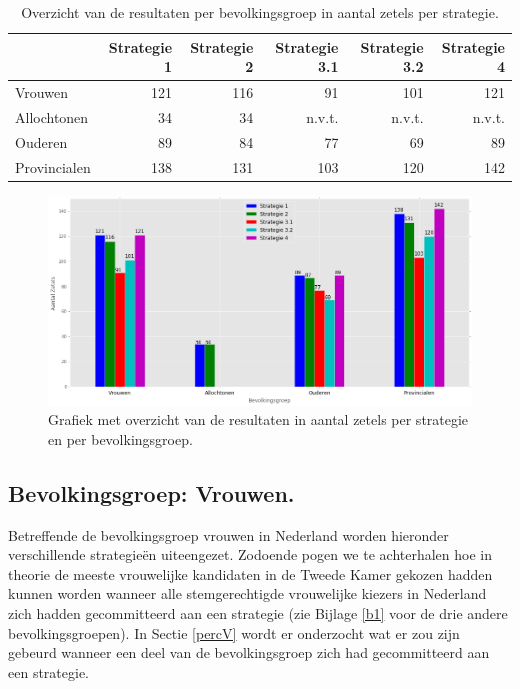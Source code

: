 \begin{table}[h]
\captionsetup{skip=-2pt}
\begin{center}
\begin{footnotesize}
\begin{tabular}{lrrrrr}
\toprule
{} &  Strategie 1 &  Strategie 2 &  Strategie 3.1 &  Strategie 3.2 &  Strategie 4 \\
\midrule
Vrouwen      &         121 &          116 &             91 &            101 &          121 \\
Allochtonen  &           34 &           34 &            n.v.t. &           n.v.t. &          n.v.t. \\
Ouderen      &           89 &           84 &             77 &             69 &           89 \\
Provincialen &          138 &          131 &            103 &            120 &          142 \\
\bottomrule
			
			
\end{tabular}
\end{footnotesize}
\end{center}
\caption{Overzicht van de resultaten per bevolkingsgroep in aantal zetels per strategie.}
\label{table:S_overzicht} 
\end{table}


\begin{figure}[H]
\captionsetup{skip=0pt}

	\includegraphics[width=0.95\linewidth]{overzicht_resultaten_strategien_plot1.png}

			\caption{Grafiek met overzicht van de resultaten in aantal zetels per strategie en per bevolkingsgroep.}

\label{fig:S_overzicht}
\end{figure}


\subsection{Bevolkingsgroep: Vrouwen.}
\label{vrouwen}
Betreffende de bevolkingsgroep vrouwen in Nederland worden hieronder verschillende strategie\"{e}n uiteengezet. Zodoende pogen we te achterhalen hoe in theorie de meeste vrouwelijke kandidaten in de Tweede Kamer gekozen hadden kunnen worden wanneer alle stemgerechtigde vrouwelijke kiezers in Nederland zich hadden gecommitteerd aan een strategie (zie Bijlage \ref{b1} voor de drie andere bevolkingsgroepen). In Sectie \ref{percV} wordt er onderzocht wat er zou zijn gebeurd wanneer een deel van de bevolkingsgroep zich had gecommitteerd aan een strategie. 

